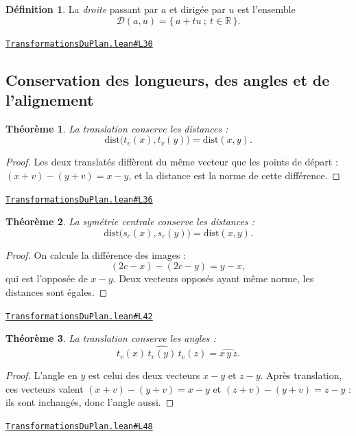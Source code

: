 \documentclass[11pt,a4paper]{article}
\theoremstyle{definition}
\newtheorem{definition}{Définition}
\theoremstyle{plain}
\newtheorem{theoreme}{Théorème}
\newcommand{\source}[2]{\par\smallskip\noindent\hfill{\footnotesize\href{#1}{\texttt{#2}}}\par\smallskip}
\begin{document}
\begin{definition}
La \emph{droite} passant par $a$ et dirigée par $u$ est l'ensemble
\[ \mathcal{D}(a, u) = \{\, a + tu \ ;\ t \in \mathbb{R} \,\} . \]
\end{definition}
\source{https://github.com/Commutator-IO/learn-lean/blob/main/cours/01-college/03-transformations-du-plan/TransformationsDuPlan.lean\#L30}{TransformationsDuPlan.lean\#L30}

\subsection{Conservation des longueurs, des angles et de l'alignement}

\begin{theoreme}
La translation conserve les distances :
\[ \mathrm{dist}\bigl(t_v(x), t_v(y)\bigr) = \mathrm{dist}(x, y) . \]
\end{theoreme}

\begin{proof}
Les deux translatés diffèrent du même vecteur que les points de départ :
$(x + v) - (y + v) = x - y$, et la distance est la norme de cette différence.
\end{proof}
\source{https://github.com/Commutator-IO/learn-lean/blob/main/cours/01-college/03-transformations-du-plan/TransformationsDuPlan.lean\#L36}{TransformationsDuPlan.lean\#L36}

\begin{theoreme}
La symétrie centrale conserve les distances :
\[ \mathrm{dist}\bigl(s_c(x), s_c(y)\bigr) = \mathrm{dist}(x, y) . \]
\end{theoreme}

\begin{proof}
On calcule la différence des images :
\[ (2c - x) - (2c - y) = y - x , \]
qui est l'opposée de $x - y$. Deux vecteurs opposés ayant même norme, les distances sont
égales.
\end{proof}
\source{https://github.com/Commutator-IO/learn-lean/blob/main/cours/01-college/03-transformations-du-plan/TransformationsDuPlan.lean\#L42}{TransformationsDuPlan.lean\#L42}

\begin{theoreme}
La translation conserve les angles :
\[ \widehat{t_v(x)\,t_v(y)\,t_v(z)} = \widehat{x\,y\,z} . \]
\end{theoreme}

\begin{proof}
L'angle en $y$ est celui des deux vecteurs $x - y$ et $z - y$. Après translation, ces
vecteurs valent $(x+v) - (y+v) = x - y$ et $(z+v) - (y+v) = z - y$ : ils sont inchangés,
donc l'angle aussi.
\end{proof}
\source{https://github.com/Commutator-IO/learn-lean/blob/main/cours/01-college/03-transformations-du-plan/TransformationsDuPlan.lean\#L48}{TransformationsDuPlan.lean\#L48}
\end{document}
